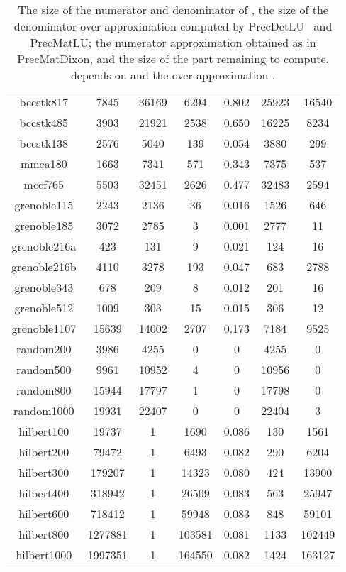 \documentclass{acm_proc_article-sp}   \usepackage{graphicx,url}
\newcommand{\algrdDet}{PrecDetLU}
\newcommand{\algrdMat}{PrecMatLU}
\newcommand{\algrdDixon}{PrecMatDixon}
\begin{document}
\begin{table}\centering
\begin{tiny}
\begin{tabular}{|@{}c@{}|@{}c@{}|@{}c@{}|@{}c@{}|@{}c@{}|@{}c@{}|@{}c@{}|}\hline
 &  & &&  & & \\\hline
bccstk817   &7845   &36169  &6294   &0.802  &25923  &16540\\\hline
bccstk485   &3903   &21921  &2538   &0.650  &16225  &8234\\\hline
bccstk138   &2576   &5040   &139    &0.054  &3880   &299\\\hline
mmca180        &1663   &7341   &571    &0.343  &7375   &537\\\hline
mccf765        &5503   &32451  &2626   &0.477  &32483  &2594\\\hline
grenoble115 &2243   &2136   &36     &0.016  &1526   &646\\\hline
grenoble185 &3072   &2785   &3      &0.001  &2777   &11\\\hline
grenoble216a&423    &131    &9      &0.021  &124    &16\\\hline
grenoble216b&4110   &3278   &193    &0.047  &683    &2788\\\hline
grenoble343 &678    &209    &8      &0.012  &201    &16\\\hline
grenoble512 &1009   &303    &15     &0.015  &306    &12\\\hline
grenoble1107&15639  &14002  &2707   &0.173  &7184   &9525\\\hline
random200   &3986   &4255   &0      &0      &4255   &0\\\hline
random500   &9961   &10952  &4      &0      &10956  &0\\\hline
random800   &15944  &17797  &1      &0      &17798  &0\\\hline
random1000  &19931  &22407  &0      &0      &22404  &3\\\hline\hline
hilbert100  &19737  &1      &1690   &0.086  &130    &1561\\\hline
hilbert200  &79472  &1      &6493   &0.082  &290    &6204\\\hline
hilbert300  &179207 &1      &14323  &0.080  &424    &13900\\\hline
hilbert400  &318942 &1      &26509  &0.083  &563    &25947\\\hline
hilbert600  &718412 &1      &59948  &0.083  &848    &59101\\\hline
hilbert800  &1277881&1      &103581 &0.081  &1133   &102449\\\hline
hilbert1000 &1997351&1      &164550 &0.082  &1424   &163127\\\hline
\end{tabular}\caption{The size of the numerator  and denominator  of , the size of the denominator over-approximation  computed by \algrdDet~ and \algrdMat; the numerator approximation  obtained as  in \algrdDixon, and the size of the part remaining to compute.  depends on  and the over-approximation .}\label{tab:app}
\end{tiny}
\end{table}
\end{document}
